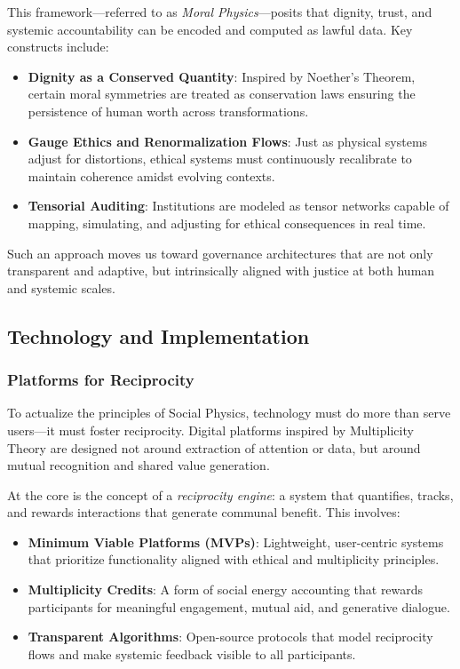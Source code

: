 \documentclass{article}
\theoremstyle{plain}
\theoremstyle{claimstyle}
\begin{document}
This framework—referred to as \textit{Moral Physics}—posits that dignity, trust, and systemic accountability can be encoded and computed as lawful data. Key constructs include:

\begin{itemize}
    \item \textbf{Dignity as a Conserved Quantity}: Inspired by Noether's Theorem, certain moral symmetries are treated as conservation laws ensuring the persistence of human worth across transformations.
    \item \textbf{Gauge Ethics and Renormalization Flows}: Just as physical systems adjust for distortions, ethical systems must continuously recalibrate to maintain coherence amidst evolving contexts.
    \item \textbf{Tensorial Auditing}: Institutions are modeled as tensor networks capable of mapping, simulating, and adjusting for ethical consequences in real time.
\end{itemize}

Such an approach moves us toward governance architectures that are not only transparent and adaptive, but intrinsically aligned with justice at both human and systemic scales.


\subsection{Technology and Implementation}

\subsubsection{Platforms for Reciprocity}

To actualize the principles of Social Physics, technology must do more than serve users—it must foster reciprocity. Digital platforms inspired by Multiplicity Theory are designed not around extraction of attention or data, but around mutual recognition and shared value generation.

At the core is the concept of a \textit{reciprocity engine}: a system that quantifies, tracks, and rewards interactions that generate communal benefit. This involves:

\begin{itemize}
    \item \textbf{Minimum Viable Platforms (MVPs)}: Lightweight, user-centric systems that prioritize functionality aligned with ethical and multiplicity principles.
    \item \textbf{Multiplicity Credits}: A form of social energy accounting that rewards participants for meaningful engagement, mutual aid, and generative dialogue.
    \item \textbf{Transparent Algorithms}: Open-source protocols that model reciprocity flows and make systemic feedback visible to all participants.
\end{itemize}
\end{document}
